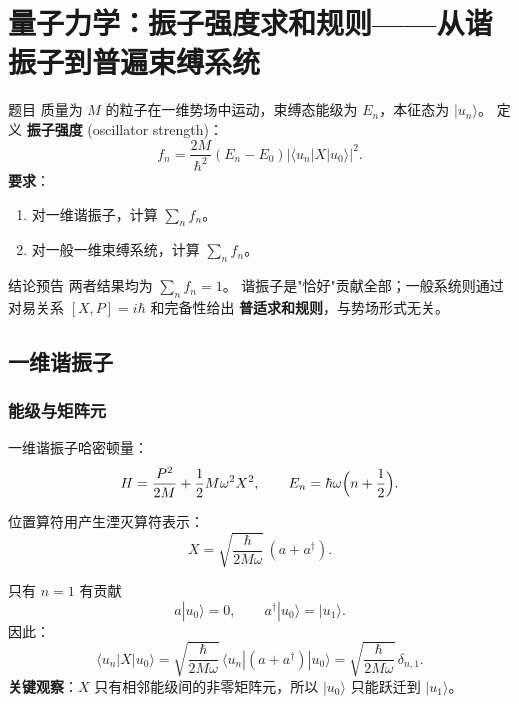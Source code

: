 \section{量子力学：振子强度求和规则——从谐振子到普遍束缚系统}

\begin{modelbox}{题目}
质量为 $M$ 的粒子在一维势场中运动，束缚态能级为 $E_n$，本征态为 $|u_n\rangle$。
定义 \textbf{振子强度} (oscillator strength)：
\[
  f_n = \frac{2M}{\hbar^2}(E_n - E_0) \bigl|\langle u_n|X|u_0\rangle\bigr|^2.
\]
\textbf{要求}：
\begin{enumerate}
  \item 对一维谐振子，计算 $\displaystyle\sum_n f_n$。
  \item 对一般一维束缚系统，计算 $\displaystyle\sum_n f_n$。
\end{enumerate}
\end{modelbox}

\vspace{0.3em}
\begin{insightbox}{结论预告}
两者结果均为 $\displaystyle\sum_n f_n = 1$。
谐振子是"恰好"贡献全部；一般系统则通过对易关系 $[X,P]=i\hbar$ 和完备性给出 \textbf{普适求和规则}，与势场形式无关。
\end{insightbox}


\subsection{一维谐振子}

\subsubsection{能级与矩阵元}

一维谐振子哈密顿量：
\[
  H = \frac{P^2}{2M} + \frac{1}{2}M\omega^2 X^2, \qquad
  E_n = \hbar\omega\Bigl(n+\frac{1}{2}\Bigr).
\]

位置算符用产生湮灭算符表示：
\[
  X = \sqrt{\frac{\hbar}{2M\omega}}\,(a + a^\dagger).
\]

\begin{derivationbox}{只有 $n=1$ 有贡献}
\[
  a|u_0\rangle = 0, \qquad a^\dagger|u_0\rangle = |u_1\rangle.
\]
因此：
\[
  \langle u_n|X|u_0\rangle
  = \sqrt{\frac{\hbar}{2M\omega}}\,
    \langle u_n|(a+a^\dagger)|u_0\rangle
  = \sqrt{\frac{\hbar}{2M\omega}}\,\delta_{n,1}.
\]
\textbf{关键观察}：$X$ 只有相邻能级间的非零矩阵元，所以 $|u_0\rangle$ 只能跃迁到 $|u_1\rangle$。
\end{derivationbox}

